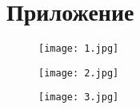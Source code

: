 \chapter*{Приложение}

\begin{figure}[h] %
    \centering
    \texttt{[image: 1.jpg]} %
    \caption{}
    \label{fig:myimage1}
\end{figure}

\begin{figure}[h] %
    \centering
    \texttt{[image: 2.jpg]} %
    \caption{}
    \label{fig:myimage2}
\end{figure}


\begin{figure}[h] %
    \centering
    \texttt{[image: 3.jpg]} %
    \caption{}
    \label{fig:myimage3}
\end{figure}